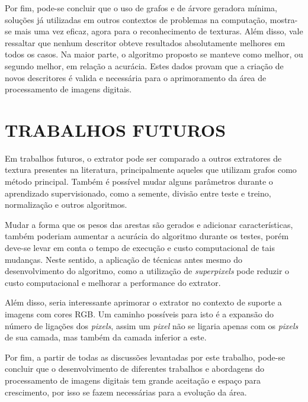 \par Por fim, pode-se concluir que o uso de grafos e de árvore geradora mínima, soluções já utilizadas em outros contextos de problemas na computação, mostra-se mais uma vez eficaz, agora para o reconhecimento de texturas. Além disso, vale ressaltar que nenhum descritor obteve resultados absolutamente melhores em todos os casos. Na maior parte, o algoritmo proposto se manteve como melhor, ou segundo melhor, em relação a acurácia. Estes dados provam que a criação de novos descritores é valida e necessária para o aprimoramento da área de processamento de imagens digitais.

\section{TRABALHOS FUTUROS}
\label{sec:trabalhosFuturos}

\par Em trabalhos futuros, o extrator pode ser comparado a outros extratores de textura presentes na literatura, principalmente aqueles que utilizam grafos como método principal. Também é possível mudar alguns parâmetros durante o aprendizado supervisionado, como a semente, divisão entre teste e treino, normalização e outros algoritmos.

\par Mudar a forma que os pesos das arestas são gerados e adicionar características, também poderiam aumentar a acurácia do algoritmo durante os testes, porém deve-se levar em conta o tempo de execução e custo computacional de tais mudanças. Neste sentido, a aplicação de técnicas antes mesmo do desenvolvimento do algoritmo, como a utilização de \textit{superpixels} pode reduzir o custo computacional e melhorar a performance do extrator.

\par Além disso, seria interessante aprimorar o extrator no contexto de suporte a imagens com cores RGB. Um caminho possíveis para isto é a expansão do número de ligações dos \textit{pixels}, assim um \textit{pixel} não se ligaria apenas com os \textit{pixels} de sua camada, mas também da camada inferior a este.

\par Por fim, a partir de todas as discussões levantadas por este trabalho, pode-se concluir que o desenvolvimento de diferentes trabalhos e abordagens do processamento de imagens digitais tem grande aceitação e espaço para crescimento, por isso se fazem necessárias para a evolução da área.
